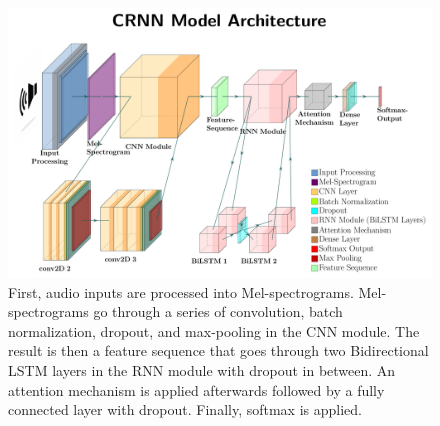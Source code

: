 \documentclass[../main.tex]{subfiles}
\begin{document}
\begin{figure}[ht]
    \centering
    \includegraphics[width=\textwidth]{../figure/architecture_figure.pdf}
    \caption{First, audio inputs are processed into Mel-spectrograms. Mel-spectrograms 
    go through a series of convolution, batch normalization, dropout, and max-pooling 
    in the CNN module. The result is then a feature sequence that goes through 
    two Bidirectional LSTM layers in the RNN module with dropout in between.
    An attention mechanism is applied afterwards followed by a fully connected
    layer with dropout. Finally, softmax is applied.}
    \label{fig:architecture}
\end{figure}
\end{document}
